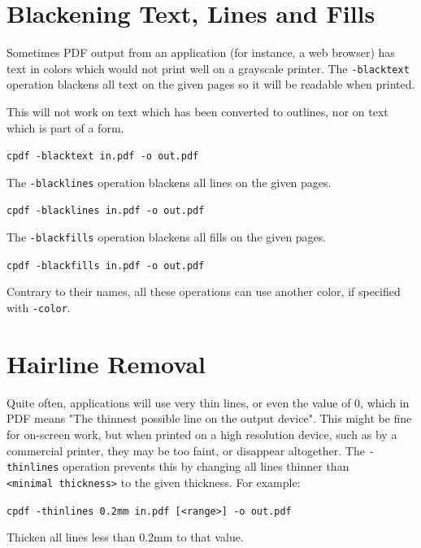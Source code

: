 \documentclass{book}
\begin{document}
  \section{Blackening Text, Lines and Fills}
  Sometimes PDF output from an application (for instance, a web browser) has
text in colors which would not print well on a grayscale printer. The
\texttt{-blacktext} operation blackens all text on the given pages so it will be readable
when printed.

  This will not work on text which has been converted to outlines, nor on text
which is part of a form.

  \begin{framed}
    \noindent\small\verb!cpdf -blacktext in.pdf -o out.pdf!
  \end{framed}


\noindent The \texttt{-blacklines} operation blackens all lines on the given pages.

  \begin{framed}
    \noindent\small\verb!cpdf -blacklines in.pdf -o out.pdf!
  \end{framed}

\noindent The \texttt{-blackfills} operation blackens all fills on the given pages.

  \begin{framed}
    \noindent\small\verb!cpdf -blackfills in.pdf -o out.pdf!
  \end{framed}

\noindent Contrary to their names, all these operations can use another color, if specified with \texttt{-color}.

  \section{Hairline Removal}
  Quite often, applications will use very thin lines, or even the value of 0,
which in PDF means "The thinnest possible line on the output device". This
might be fine for on-screen work, but when printed on a high resolution device,
such as by a commercial printer, they may be too faint, or disappear
altogether. The \texttt{-thinlines} operation prevents this by changing all lines
thinner than \texttt{<minimal~thickness>} to the given thickness. For example:

  \begin{framed}
  \small\noindent\verb!cpdf -thinlines 0.2mm in.pdf [<range>] -o out.pdf!

  \vspace{2.5mm}
  \noindent Thicken all lines less than 0.2mm to that value.
  \end{framed} 
\end{document}
